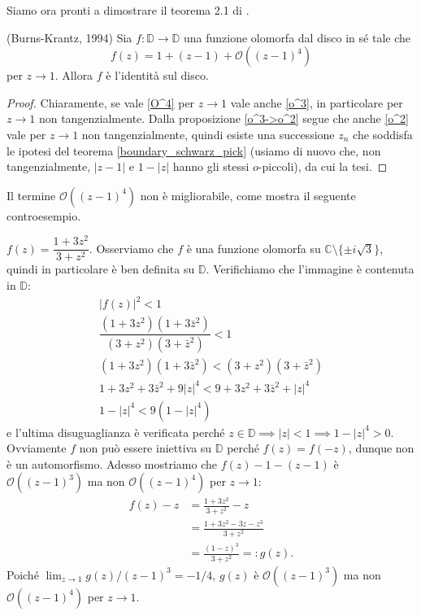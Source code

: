 Siamo ora pronti a dimostrare il teorema 2.1 di \cite{BK}.

\begin{thm} \label{burns_krantz}
  (Burns-Krantz, 1994) Sia $f:\mathbb{D} \longrightarrow \mathbb{D}$ una funzione olomorfa dal disco in sé tale che
  \begin{equation} \label{O^4}
    f(z)=1+(z-1)+\mathcal{O}((z-1)^4)
  \end{equation}
  per $z \longrightarrow 1$. Allora $f$ è l'identità sul disco.
\end{thm}

\begin{proof}
  Chiaramente, se vale \eqref{O^4} per $z \longrightarrow 1$ vale anche \eqref{o^3}, in particolare per $z \longrightarrow 1$ non tangenzialmente.
  Dalla proposizione \ref{o^3->o^2} segue che anche \eqref{o^2} vale per $z \longrightarrow 1$ non tangenzialmente, quindi esiste una successione $z_n$ che soddisfa le ipotesi del teorema \ref{boundary_schwarz_pick} (usiamo di nuovo che, non tangenzialmente, $|z-1|$ e $1-|z|$ hanno gli stessi $o$-piccoli), da cui la tesi.
\end{proof}

Il termine $\mathcal{O}((z-1)^4)$ non è migliorabile, come mostra il seguente controesempio.

\begin{ex}
  $f(z)=\dfrac{1+3z^2}{3+z^2}$. Osserviamo che $f$ è una funzione olomorfa su $\mathbb{C} \setminus \{\pm i\sqrt{3}\}$, quindi in particolare è ben definita su $\mathbb{D}$. Verifichiamo che l'immagine è contenuta in $\mathbb{D}$:
  \begin{align*}
    |f(z)|^2<1 \\
    \dfrac{(1+3z^2)(1+3\bar{z}^2)}{(3+z^2)(3+\bar{z}^2)} < 1 \\
    (1+3z^2)(1+3\bar{z}^2) < (3+z^2)(3+\bar{z}^2) \\
    1+3z^2+3\bar{z}^2+9|z|^4 < 9+3z^2+3\bar{z}^2+|z|^4 \\
    1-|z|^4 < 9(1-|z|^4)
  \end{align*}
  e l'ultima disuguaglianza è verificata perché $z \in \mathbb{D} \implies |z|<1 \implies 1-|z|^4>0$. \\
  Ovviamente $f$ non può essere iniettiva su $\mathbb{D}$ perché $f(z)=f(-z)$, dunque non è un automorfismo. Adesso mostriamo che $f(z)-1-(z-1)$ è $\mathcal{O}((z-1)^3)$ ma non $\mathcal{O}((z-1)^4)$ per $z \longrightarrow 1$:
  \begin{align*}
    f(z)-z & =\frac{1+3z^2}{3+z^2}-z \\
    & =\frac{1+3z^2-3z-z^3}{3+z^2} \\
    & =\frac{(1-z)^3}{3+z^2}=:g(z).
  \end{align*}
  Poiché $\displaystyle \lim_{z \longrightarrow 1} g(z)/(z-1)^3=-1/4$, $g(z)$ è $\mathcal{O}((z-1)^3)$ ma non $\mathcal{O}((z-1)^4)$ per $z \longrightarrow 1$.
\end{ex}
